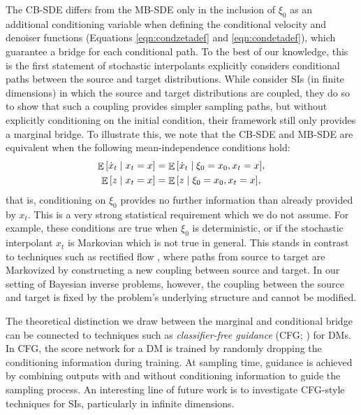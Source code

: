 The CB-SDE differs from the MB-SDE only in the inclusion of \(\xi_{0}\) as an additional conditioning variable when defining the conditional velocity and denoiser functions (Equations \ref{eqn:condzetadef} and \ref{eqn:condetadef}), which guarantee a bridge for each conditional path. To the best of our knowledge, this is the first statement of stochastic interpolants explicitly considers conditional paths between the source and target distributions. While \citet{albergo2023stochastic} consider SIs (in finite dimensions) in which the source and target distributions are coupled, they do so to show that such a coupling provides simpler sampling paths, but without explicitly conditioning on the initial condition, their framework still only provides a marginal bridge. To illustrate this, we note that the CB-SDE and MB-SDE are equivalent when the following mean-independence conditions hold:
\begin{align*}
  \mathop{\mathbb{E}}\qty[\dot{x}_{t} \mid x_{t} = x] &= \mathop{\mathbb{E}}\qty[\dot{x}_{t} \mid \xi_{0} = x_{0}, x_{t} = x], \\
  \mathop{\mathbb{E}}\qty[z \mid x_{t} = x] &= \mathop{\mathbb{E}}\qty[z \mid \xi_{0} = x_{0}, x_{t} = x],
\end{align*}
that is, conditioning on \(\xi_{0}\) provides no further information than already provided by \(x_{t}\). This is a very strong statistical requirement which we do not assume. For example, these conditions are true when \(\xi_{0}\) is deterministic, or if the stochastic interpolant \(x_{t}\) is Markovian which is not true in general. This stands in contrast to techniques such as rectified flow \citep{liu2022flow}, where paths from source to target are Markovized by constructing a new coupling between source and target.  In our setting of Bayesian inverse problems, however, the coupling between the source and target is fixed by the problem's underlying structure and cannot be modified.%
\begin{remarkbox}
  \begin{remark}
    The theoretical distinction we draw between the marginal and conditional bridge can be connected to techniques such as  \textit{classifier-free guidance} (CFG; \citealp{ho2022classifier}) for DMs. In CFG, the score network for a DM is trained by randomly dropping the conditioning information during training. At sampling time, guidance is achieved by combining outputs with and without conditioning information to guide the sampling process. An interesting line of future work is to investigate CFG-style techniques for SIs, particularly in infinite dimensions.
  \end{remark}
\end{remarkbox}

